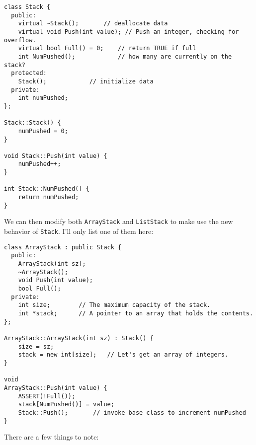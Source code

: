 \begin{verbatim}
class Stack {
  public:
    virtual ~Stack();		// deallocate data
    virtual void Push(int value); // Push an integer, checking for overflow.
    virtual bool Full() = 0;	// return TRUE if full
    int NumPushed();	        // how many are currently on the stack?
  protected:
    Stack();			// initialize data
  private:
    int numPushed;
};

Stack::Stack() {
    numPushed = 0;
}

void Stack::Push(int value) {
    numPushed++;
}

int Stack::NumPushed() {
    return numPushed;
}
\end{verbatim}

We can then modify both {\tt ArrayStack} and {\tt ListStack}
to make use the new behavior of {\tt Stack}.  I'll only list
one of them here:

\begin{verbatim}
class ArrayStack : public Stack {
  public:
    ArrayStack(int sz);
    ~ArrayStack();
    void Push(int value);
    bool Full();
  private:
    int size;        // The maximum capacity of the stack.
    int *stack;      // A pointer to an array that holds the contents.
};

ArrayStack::ArrayStack(int sz) : Stack() {
    size = sz;
    stack = new int[size];   // Let's get an array of integers.
}

void
ArrayStack::Push(int value) {
    ASSERT(!Full());
    stack[NumPushed()] = value;
    Stack::Push();	     // invoke base class to increment numPushed
}
\end{verbatim}

There are a few things to note:

